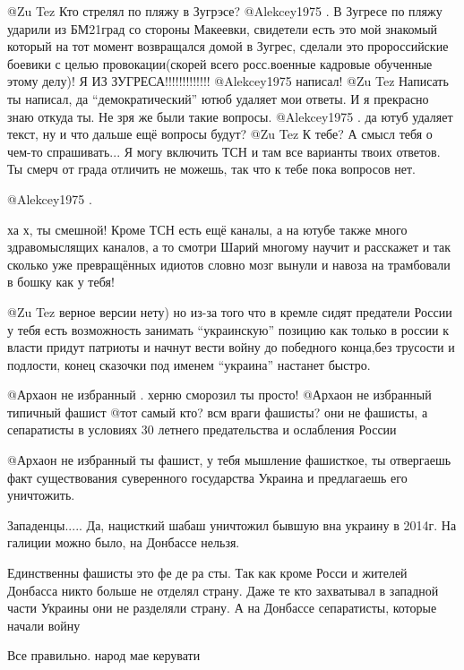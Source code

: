 \begin{multicols}{2}
\begin{itemize}
 @Zu Tez  Кто стрелял по пляжу в Зугрэсе?
 @Alekcey1975  . В Зугресе по пляжу ударили из  БМ21град со стороны Макеевки, свидетели есть это мой знакомый который на тот момент возвращался домой в Зугрес, сделали это пророссийские боевики с целью провокации(скорей всего росс.военные кадровые обученные этому делу)! Я ИЗ ЗУГРЕСА!!!!!!!!!!!!!
 @Alekcey1975  написал!
 @Zu Tez  Написать ты написал, да \enquote{демократический} ютюб удаляет мои
 ответы. И я прекрасно знаю откуда ты. Не зря же были такие вопросы.
 @Alekcey1975 . да ютуб удаляет текст, ну и что дальше ещё вопросы будут?
 @Zu Tez  К тебе? А смысл тебя о чем-то спрашивать... Я могу включить ТСН и там
 все варианты твоих ответов. Ты смерч от града отличить не можешь, так что к
 тебе пока вопросов нет. 

 @Alekcey1975  . 

ха х, ты смешной! Кроме ТСН есть ещё каналы, а на ютубе также много
здравомыслящих каналов, а то смотри Шарий многому научит и расскажет и так
сколько уже превращённых  идиотов словно мозг вынули и навоза на трамбовали в
бошку как у тебя!

 @Zu Tez  верное версии нету) но из-за того что в кремле сидят предатели России
 у тебя есть возможность занимать \enquote{украинскую} позицию как только в россии к
 власти придут патриоты и начнут вести войну до победного конца,без трусости и
 подлости, конец сказочки под именем \enquote{украина} настанет быстро.

 @Архаон не избранный  . херню сморозил ты просто!
 @Архаон не избранный  типичный фашист
 @тот самый  кто? всм враги фашисты? они не фашисты, а сепаратисты в условиях 30
 летнего предательства  и ослабления России 


@Архаон не избранный  ты фашист, у тебя мышление фашисткое, ты отвергаешь факт
существования суверенного государства Украина и предлагаешь его уничтожить. 

\end{itemize} %

Западенцы.....
Да, нацисткий шабаш уничтожил бывшую вна украину в 2014г. На галиции можно было, на Донбассе нельзя. 

\begin{itemize} %

Единственны фашисты это фе  де   ра   сты. Так как кроме Росси и жителей
Донбасса никто больше не отделял страну. Даже те кто захватывал в западной
части Украины они не разделяли страну. А на Донбассе сепаратисты, которые
начали войну 

\end{itemize} %

Все правильно. народ мае керувати 

\end{multicols} %

